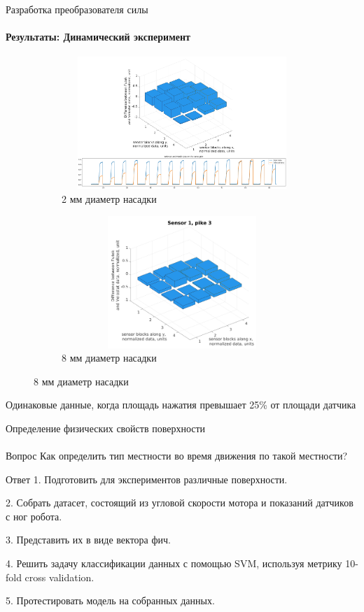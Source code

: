 \documentclass[aspectratio=169,xcolor=table]{beamer}
\begin{document}
\begin{frame}[t]{Разработка преобразователя силы}
    \framesubtitle{Результаты: Динамический эксперимент}
    \vspace{-15pt}
    \begin{figure}[H]
        \begin{subfigure}{0.64\textwidth}
            \centering\includegraphics[height=5cm,width=1\textwidth,keepaspectratio]{sens1_pike1_mod.png}
            \caption*{2 мм диаметр насадки}
            \label{fig:sens1_pike1}
        \end{subfigure}
        \begin{subfigure}{0.34\textwidth}
            \centering\includegraphics[height=5cm,width=1\textwidth,keepaspectratio]{sens1_pike3.png}
            \caption*{8 мм диаметр насадки}
            \label{fig:sens1_pike3}
        \end{subfigure}
    \end{figure}
    \vspace{-0.8cm}
    \alert{Одинаковые данные, когда площадь нажатия превышает 25\% от площади датчика}
\end{frame}

\begin{frame}[t]{Определение физических свойств поверхности}
    \framesubtitle{}
    \vspace{-0.3cm}
    {\large\begin{block}{Вопрос}
        Как определить тип местности во время движения по такой местности?
        \end{block}}
    {\large\begin{alertblock}{Ответ}
        1. Подготовить для экспериментов различные поверхности.

        2. Собрать датасет, состоящий из угловой скорости мотора и показаний датчиков с ног робота.

        3. Представить их в виде вектора фич.

        4. Решить задачу классификации данных с помощью SVM, используя метрику 10-fold cross validation. 

        5. Протестировать модель на собранных данных.
        \end{alertblock}}
\end{frame}
\end{document}
